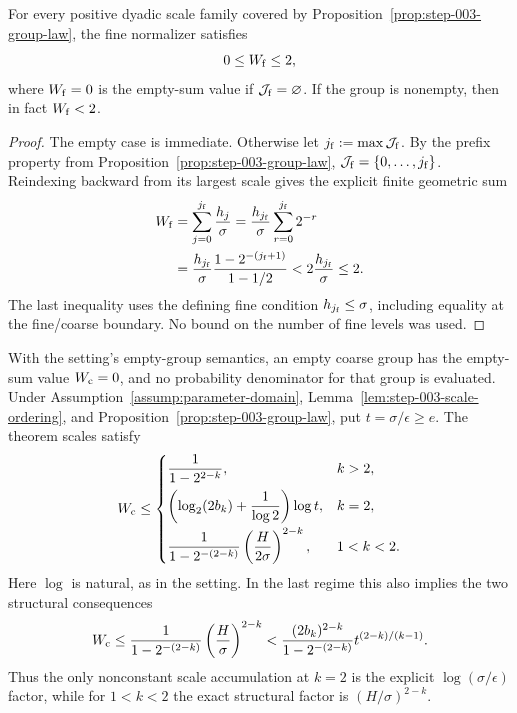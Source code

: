 \begin{lemma}\label{lem:step-003-fine-normalizer}
For every positive dyadic scale family covered by
Proposition~\ref{prop:step-003-group-law}, the fine normalizer satisfies
\[
0\leq W_{\rm f}\leq2,
\]
where \(W_{\rm f}=0\) is the empty-sum value if
\(\mathcal J_{\rm f}=\varnothing\). If the group is nonempty, then in fact
\(W_{\rm f}<2\).
\end{lemma}

\begin{proof}
The empty case is immediate. Otherwise let
\(j_{\rm f}:=\max\mathcal J_{\rm f}\). By the prefix property from
Proposition~\ref{prop:step-003-group-law},
\(\mathcal J_{\rm f}=\{0,\ldots,j_{\rm f}\}\). Reindexing backward from its
largest scale gives the explicit finite geometric sum
\[
\begin{aligned}
W_{\rm f}
&=\sum_{j=0}^{j_{\rm f}}\frac{h_j}{\sigma}
=\frac{h_{j_{\rm f}}}{\sigma}
  \sum_{r=0}^{j_{\rm f}}2^{-r}\\
&=\frac{h_{j_{\rm f}}}{\sigma}
  \frac{1-2^{-(j_{\rm f}+1)}}{1-1/2}
<2\frac{h_{j_{\rm f}}}{\sigma}
\leq2.
\end{aligned}
\]
The last inequality uses the defining fine condition
\(h_{j_{\rm f}}\leq\sigma\), including equality at the fine/coarse boundary.
No bound on the number of fine levels was used.
\end{proof}

\begin{proposition}\label{prop:step-003-coarse-normalizers}
With the setting's empty-group semantics, an empty coarse group has the
empty-sum value \(W_{\rm c}=0\), and no probability denominator for that
group is evaluated. Under Assumption~\ref{assump:parameter-domain},
Lemma~\ref{lem:step-003-scale-ordering}, and
Proposition~\ref{prop:step-003-group-law}, put
\(t=\sigma/\epsilon\geq e\). The theorem scales satisfy
\[
W_{\rm c}\leq
\begin{cases}
\displaystyle \frac{1}{1-2^{2-k}}, & k>2,\\[0.8em]
\displaystyle
\left(\log_2(2b_k)+\frac1{\log 2}\right)
\log t, & k=2,\\[0.8em]
\displaystyle
\frac{1}{1-2^{-(2-k)}}
\left(\frac{H}{2\sigma}\right)^{2-k}, & 1<k<2.
\end{cases}
\]
Here \(\log\) is natural, as in the setting. In the last regime this also
implies the two structural consequences
\[
W_{\rm c}
\leq\frac{1}{1-2^{-(2-k)}}
\left(\frac{H}{\sigma}\right)^{2-k}
<\frac{(2b_k)^{2-k}}{1-2^{-(2-k)}}
t^{(2-k)/(k-1)}.
\]
Thus the only nonconstant scale accumulation at \(k=2\) is the explicit
\(\log(\sigma/\epsilon)\) factor, while for \(1<k<2\) the exact structural
factor is \((H/\sigma)^{2-k}\).
\end{proposition}

